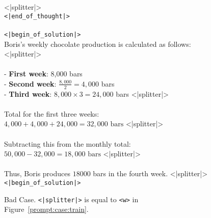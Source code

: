 \begin{figure*}[!t]
{\begin{tcolorbox}
<|splitter|>\\
\texttt{<|end\_of\_thought|>}\\
\\ \texttt{<|begin\_of\_solution|>}
\\Boris's weekly chocolate production is calculated as follows:
<|splitter|>\\
\\- \textbf{First week}: 8,000 bars  \\
- \textbf{Second week}: \( \frac{8,000}{2} = 4,000 \) bars \\ 
- \textbf{Third week}: \( 8,000 \times 3 = 24,000 \) bars  <|splitter|>\\
\\Total for the first three weeks:  \\
$4,000 + 4,000 + 24,000 = 32,000 \text{ bars}$
<|splitter|> \\
\\Subtracting this from the monthly total: \\ 
$50,000 - 32,000 = 18,000 \text{ bars}$
<|splitter|>\\
\\Thus, Boris produces \(\boxed{18000}\) bars in the fourth week. <|splitter|>\\
\texttt{<|begin\_of\_solution|>}

\end{tcolorbox}
}

\caption{Bad Case. \texttt{<|splitter|>} is equal to \texttt{<w>} in Figure~\ref{prompt:case:train}.}
\label{prompt:case}
\end{figure*}